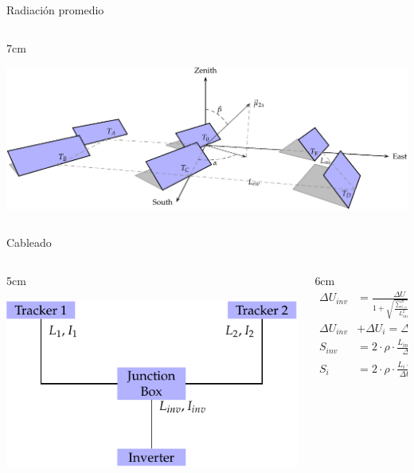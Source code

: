 \documentclass[xcolor={usenames,svgnames,dvipsnames}]{beamer}
\begin{document}
\begin{frame}[label={sec:org9d82c54}]{Radiación promedio}
\begin{columns}
\begin{column}{7cm\columnwidth}
\begin{center}
\includegraphics[width=.9\linewidth]{../figs/6trackers.pdf}
\end{center}
\end{column}
\end{columns}
\end{frame}

\begin{frame}[label={sec:org2976ae9}]{Cableado}
\begin{columns}
\begin{column}{5cm\columnwidth}
\begin{center}
\includegraphics[width=.9\linewidth]{../figs/wiring.pdf}
\end{center}
\end{column}
\begin{column}{6cm\columnwidth}
$$\begin{aligned}
    \Delta U_{inv} &= \frac{\Delta U}{1+\sqrt{\frac{\sum_{i=1}^n
          L_{i}^2 \cdot I_{i}}{L_{inv}^2 \cdot I_{inv}}}} \\
    \Delta U_{inv} &+ \Delta U_i = \Delta U\\
    S_{inv} &= 2 \cdot \rho \cdot \frac{L_{inv} \cdot
      I_{inv}}{\Delta U_{inv}} \\
    S_{i} &= 2 \cdot \rho \cdot \frac{L_{i} \cdot I_i}{\Delta U_i}
  \end{aligned}$$
\end{column}
\end{columns}
\end{frame}
\end{document}

